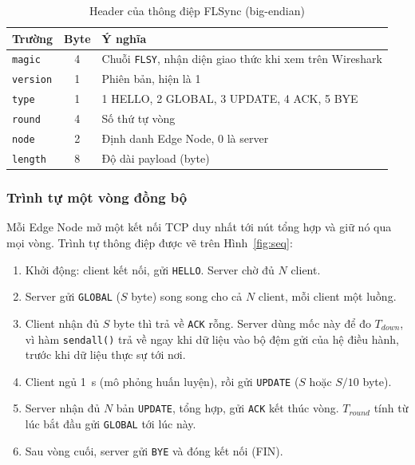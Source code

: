 \begin{table}[H]
    \centering
    \caption{Header của thông điệp FLSync (big-endian)}
    \label{tab:hdr}
    \begin{tabular}{l c l}
        \toprule
        \textbf{Trường} & \textbf{Byte} & \textbf{Ý nghĩa} \\
        \midrule
        \texttt{magic} & 4 & Chuỗi \texttt{FLSY}, nhận diện giao thức khi xem trên Wireshark \\
        \texttt{version} & 1 & Phiên bản, hiện là 1 \\
        \texttt{type} & 1 & 1 HELLO, 2 GLOBAL, 3 UPDATE, 4 ACK, 5 BYE \\
        \texttt{round} & 4 & Số thứ tự vòng \\
        \texttt{node} & 2 & Định danh Edge Node, 0 là server \\
        \texttt{length} & 8 & Độ dài payload (byte) \\
        \bottomrule
    \end{tabular}
\end{table}

\subsubsection{Trình tự một vòng đồng bộ}
Mỗi Edge Node mở một kết nối TCP duy nhất tới nút tổng hợp và giữ nó qua mọi vòng. Trình tự thông điệp được vẽ trên Hình~\ref{fig:seq}:
\begin{enumerate}
    \item Khởi động: client kết nối, gửi \texttt{HELLO}. Server chờ đủ $N$ client.
    \item Server gửi \texttt{GLOBAL} ($S$ byte) song song cho cả $N$ client, mỗi client một luồng.
    \item Client nhận đủ $S$ byte thì trả về \texttt{ACK} rỗng. Server dùng mốc này để đo $T_{down}$, vì hàm \texttt{sendall()} trả về ngay khi dữ liệu vào bộ đệm gửi của hệ điều hành, trước khi dữ liệu thực sự tới nơi.
    \item Client ngủ 1~s (mô phỏng huấn luyện), rồi gửi \texttt{UPDATE} ($S$ hoặc $S/10$ byte).
    \item Server nhận đủ $N$ bản \texttt{UPDATE}, tổng hợp, gửi \texttt{ACK} kết thúc vòng. $T_{round}$ tính từ lúc bắt đầu gửi \texttt{GLOBAL} tới lúc này.
    \item Sau vòng cuối, server gửi \texttt{BYE} và đóng kết nối (FIN).
\end{enumerate}

